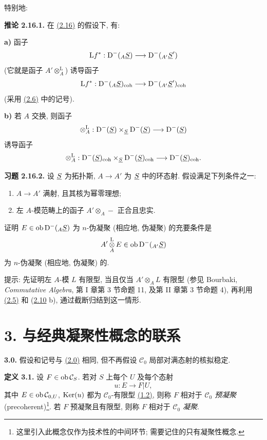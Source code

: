 特别地:

\textbf{推论 2.16.1.} 在 \hyperlink{sga6.e01.cor.2-16}{(2.16)} 的假设下, 有:

\textbf{a)} 函子
\[
  \mathrm L f^*: \mathrm D^-(_A \underline S)\longrightarrow \mathrm D^-(_{A'}\underline S')
\]
(它就是函子 \(A'\otimes_A^{\mathrm L}\)) 诱导函子
\[
  \mathrm L f^*: \mathrm D^-(_A \underline S)_{\operatorname{coh}}\longrightarrow \mathrm D^-(_{A'}\underline S')_{\operatorname{coh}}
\]
(采用 \hyperlink{sga6.e01.schol.2-6}{(2.6)} 中的记号).

\textbf{b)} 若 \(A\) 交换, 则函子
\[
  \otimes_A^{\mathrm L}:\mathrm D^-(\underline S)\times_{\underline S}\mathrm D^-(\underline S)
  \longrightarrow \mathrm D^-(\underline S)
\]
诱导函子
\[
  \otimes_A^{\mathrm L}:\mathrm D^-(\underline S)_{\operatorname{coh}}\times_{\underline S}\mathrm D^-(\underline S)_{\operatorname{coh}}
  \longrightarrow \mathrm D^-(\underline S)_{\operatorname{coh}} .
\]

\textbf{习题 2.16.2.} 设 \(\underline S\) 为拓扑斯, \(A\to A'\) 为 \(\underline S\) 中的环态射. 假设满足下列条件之一:
\begin{enumerate}[label=(\roman*)]
\item \(A\to A'\) 满射, 且其核为幂零理想;
\item 左 \(A\)-模范畴上的函子 \(A'\otimes_A-\) 正合且忠实.
\end{enumerate}
证明 \(E\in\operatorname{ob}\mathrm D^-(_A \underline S)\) 为 \(n\)-伪凝聚 (相应地, 伪凝聚) 的充要条件是
\[
  A'\mathop{\otimes}^{\mathrm L}_A E\in\operatorname{ob}\mathrm D^-(_{A'}\underline S)
\]
为 \(n\)-伪凝聚 (相应地, 伪凝聚) 的.

提示: 先证明左 \(A\)-模 \(L\) 有限型, 当且仅当 \(A'\otimes_A L\) 有限型 (参见 Bourbaki, \emph{Commutative Algebra}, 第 I 章第 3 节命题 11, 及第 II 章第 3 节命题 4), 再利用 \hyperlink{sga6.e01.prop.2-5}{(2.5)} 和 (\hyperlink{sga6.e01.prop.2-10}{2.10} b), 通过截断归结到这一情形.

\section*{3. 与经典凝聚性概念的联系}

\textbf{3.0.} 假设和记号与 \hyperlink{sga6.e01.para.2-0}{(2.0)} 相同, 但不再假设 \(\mathcal C_0\) 局部对满态射的核拟稳定.

\textbf{定义 3.1.} 设 \(F\in\operatorname{ob}\mathcal C_S\). 若对 \(S\) 上每个 \(U\) 及每个态射
\[
  u:E\longrightarrow F|U,
\]
其中 \(E\in\operatorname{ob}\mathcal C_{0,U}\), \(\operatorname{Ker}(u)\) 都为 \(\mathcal C_0\)-有限型 \hyperlink{sga6.e01.sec.1.2}{(1.2)}, 则称 \(F\) 相对于 \(\mathcal C_0\) \emph{预凝聚} (precoherent)\footnote{这里引入此概念仅作为技术性的中间环节; 需要记住的只有凝聚性概念.}. 若 \(F\) 预凝聚且有限型, 则称 \(F\) 相对于 \(\mathcal C_0\) \emph{凝聚}.


